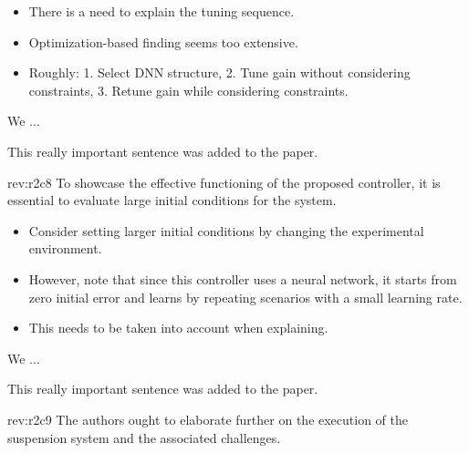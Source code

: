 \documentclass[12pt,english]{reviewresponse}
\begin{document}
\begin{howtoanswer}
    \begin{itemize}
        \item There is a need to explain the tuning sequence.
        \item Optimization-based finding seems too extensive.
        \item Roughly: 1. Select DNN structure, 2. Tune gain without considering constraints, 3. Retune gain while considering constraints.
    \end{itemize}
\end{howtoanswer}

\begin{revresponse}
    We ...
    \begin{changes}
        This really important sentence was added to the paper.
    \end{changes}
\end{revresponse}

\begin{revcomment}[2]{rev:r2c8}
    To showcase the effective functioning of the proposed controller, it is essential to evaluate large initial conditions for the system.
\end{revcomment}

\begin{howtoanswer}
    \begin{itemize}
        \item Consider setting larger initial conditions by changing the experimental environment.
        \item However, note that since this controller uses a neural network, it starts from zero initial error and learns by repeating scenarios with a small learning rate.
        \item This needs to be taken into account when explaining.
    \end{itemize}
\end{howtoanswer}

\begin{revresponse}
    We ...
    \begin{changes}
        This really important sentence was added to the paper.
    \end{changes}
\end{revresponse}

\begin{revcomment}[2]{rev:r2c9}
    The authors ought to elaborate further on the execution of the suspension system and the associated challenges.
\end{revcomment}
\end{document}

